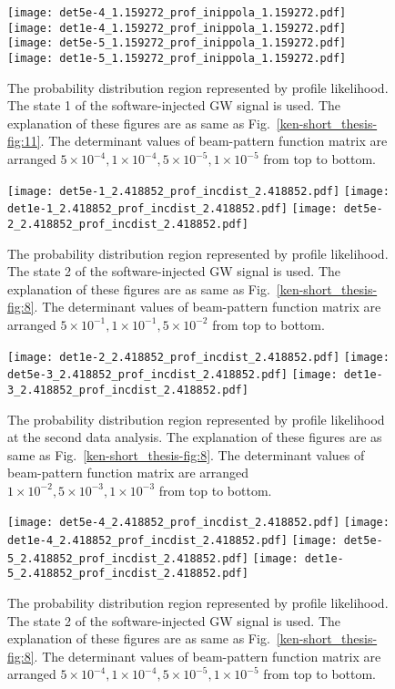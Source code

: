\documentclass[%
 aps,
 prd,
 amsmath,amssymb,
 reprint,%
superscriptaddress
]{revtex4-1}
\begin{document}
\begin{figure*}[htbp]
  \centering
    \texttt{[image: det5e-4\_1.159272\_prof\_inippola\_1.159272.pdf]}
 \texttt{[image: det1e-4\_1.159272\_prof\_inippola\_1.159272.pdf]}
    \texttt{[image: det5e-5\_1.159272\_prof\_inippola\_1.159272.pdf]}
 \texttt{[image: det1e-5\_1.159272\_prof\_inippola\_1.159272.pdf]}
    \caption{The probability distribution region represented by profile likelihood. The state 1 of the software-injected GW signal is used. The explanation of these figures are as same as Fig.~\ref{ken-short_thesis-fig:11}. The determinant values of beam-pattern function matrix are arranged $5\times10^{-4}, 1\times10^{-4}, 5\times10^{-5}, 1\times10^{-5}$ from top to bottom.\label{ken-short_thesis-fig:13}}
\end{figure*}


\begin{figure*}[tb]
  \centering
   \texttt{[image: det5e-1\_2.418852\_prof\_incdist\_2.418852.pdf]}
 \texttt{[image: det1e-1\_2.418852\_prof\_incdist\_2.418852.pdf]}
    \texttt{[image: det5e-2\_2.418852\_prof\_incdist\_2.418852.pdf]}
   \caption{The probability distribution region represented by profile likelihood. The state 2 of the software-injected GW signal is used. The explanation of these figures are as same as Fig.~\ref{ken-short_thesis-fig:8}. The determinant values of beam-pattern function matrix are arranged $5\times10^{-1}, 1\times10^{-1}, 5\times10^{-2}$ from top to bottom.\label{ken-short_thesis-fig:20}}
\end{figure*}


\begin{figure*}[htbp]
 \centering
  \texttt{[image: det1e-2\_2.418852\_prof\_incdist\_2.418852.pdf]}
    \texttt{[image: det5e-3\_2.418852\_prof\_incdist\_2.418852.pdf]}
 \texttt{[image: det1e-3\_2.418852\_prof\_incdist\_2.418852.pdf]}
    \caption{The probability distribution region represented by profile likelihood at the second data analysis. The explanation of these figures are as same as Fig.~\ref{ken-short_thesis-fig:8}. The determinant values of beam-pattern function matrix are arranged $1\times10^{-2}, 5\times10^{-3}, 1\times10^{-3}$ from top to bottom.\label{ken-short_thesis-fig:21}}
\end{figure*}


\begin{figure*}[htbp]
  \centering
    \texttt{[image: det5e-4\_2.418852\_prof\_incdist\_2.418852.pdf]}
 \texttt{[image: det1e-4\_2.418852\_prof\_incdist\_2.418852.pdf]}
    \texttt{[image: det5e-5\_2.418852\_prof\_incdist\_2.418852.pdf]}
 \texttt{[image: det1e-5\_2.418852\_prof\_incdist\_2.418852.pdf]}
    \caption{The probability distribution region represented by profile likelihood. The state 2 of the software-injected GW signal is used. The explanation of these figures are as same as Fig.~\ref{ken-short_thesis-fig:8}. The determinant values of beam-pattern function matrix are arranged $5\times10^{-4}, 1\times10^{-4}, 5\times10^{-5}, 1\times10^{-5}$ from top to bottom.\label{ken-short_thesis-fig:22}}
\end{figure*}
\end{document}
